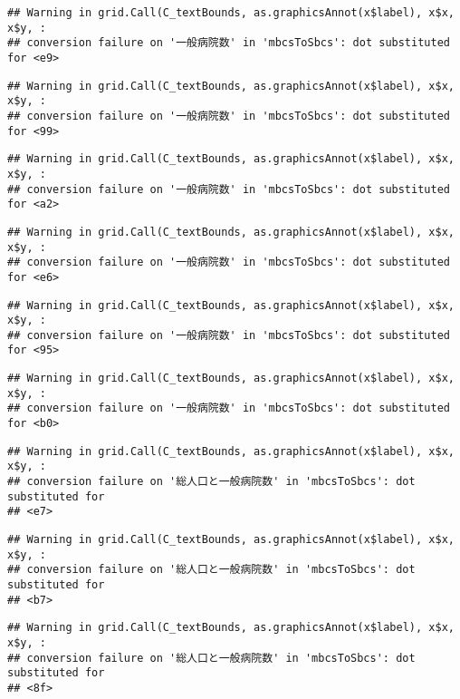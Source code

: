 \documentclass[
]{article}
\begin{document}
\begin{verbatim}
## Warning in grid.Call(C_textBounds, as.graphicsAnnot(x$label), x$x, x$y, :
## conversion failure on '一般病院数' in 'mbcsToSbcs': dot substituted for <e9>
\end{verbatim}

\begin{verbatim}
## Warning in grid.Call(C_textBounds, as.graphicsAnnot(x$label), x$x, x$y, :
## conversion failure on '一般病院数' in 'mbcsToSbcs': dot substituted for <99>
\end{verbatim}

\begin{verbatim}
## Warning in grid.Call(C_textBounds, as.graphicsAnnot(x$label), x$x, x$y, :
## conversion failure on '一般病院数' in 'mbcsToSbcs': dot substituted for <a2>
\end{verbatim}

\begin{verbatim}
## Warning in grid.Call(C_textBounds, as.graphicsAnnot(x$label), x$x, x$y, :
## conversion failure on '一般病院数' in 'mbcsToSbcs': dot substituted for <e6>
\end{verbatim}

\begin{verbatim}
## Warning in grid.Call(C_textBounds, as.graphicsAnnot(x$label), x$x, x$y, :
## conversion failure on '一般病院数' in 'mbcsToSbcs': dot substituted for <95>
\end{verbatim}

\begin{verbatim}
## Warning in grid.Call(C_textBounds, as.graphicsAnnot(x$label), x$x, x$y, :
## conversion failure on '一般病院数' in 'mbcsToSbcs': dot substituted for <b0>
\end{verbatim}

\begin{verbatim}
## Warning in grid.Call(C_textBounds, as.graphicsAnnot(x$label), x$x, x$y, :
## conversion failure on '総人口と一般病院数' in 'mbcsToSbcs': dot substituted for
## <e7>
\end{verbatim}

\begin{verbatim}
## Warning in grid.Call(C_textBounds, as.graphicsAnnot(x$label), x$x, x$y, :
## conversion failure on '総人口と一般病院数' in 'mbcsToSbcs': dot substituted for
## <b7>
\end{verbatim}

\begin{verbatim}
## Warning in grid.Call(C_textBounds, as.graphicsAnnot(x$label), x$x, x$y, :
## conversion failure on '総人口と一般病院数' in 'mbcsToSbcs': dot substituted for
## <8f>
\end{verbatim}
\end{document}
